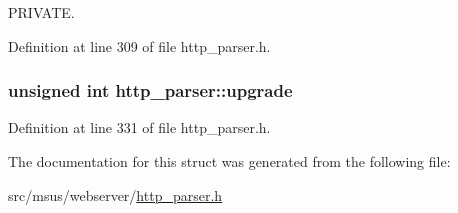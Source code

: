 P\-R\-I\-V\-A\-T\-E. 



Definition at line 309 of file http\-\_\-parser.\-h.

\hypertarget{structhttp__parser_a748f476eacc5ac56b84dd07dbafb42a4}{
\subsubsection[{upgrade}]{\setlength{\rightskip}{0pt plus 5cm}unsigned int http\-\_\-parser\-::upgrade}}\label{structhttp__parser_a748f476eacc5ac56b84dd07dbafb42a4}


Definition at line 331 of file http\-\_\-parser.\-h.



The documentation for this struct was generated from the following file\-:\begin{DoxyCompactItemize}
\item 
src/msus/webserver/\hyperlink{http__parser_8h}{http\-\_\-parser.\-h}\end{DoxyCompactItemize}
